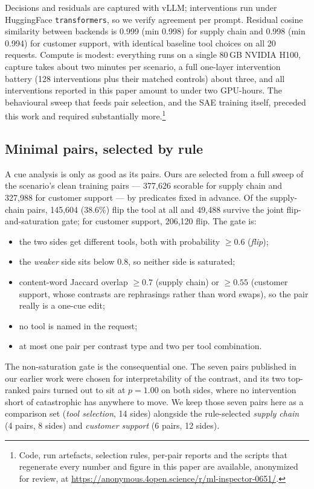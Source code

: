 \documentclass{article}
\begin{document}
Decisions and residuals are captured with vLLM; interventions run under HuggingFace \texttt{transformers}, so we verify agreement per prompt. Residual cosine similarity between backends is 0.999 (min 0.998) for supply chain and 0.998 (min 0.994) for customer support, with identical baseline tool choices on all 20 requests. Compute is modest: everything runs on a single 80\,GB NVIDIA H100, capture takes about two minutes per scenario, a full one-layer intervention battery (128 interventions plus their matched controls) about three, and all interventions reported in this paper amount to under two GPU-hours. The behavioural sweep that feeds pair selection, and the SAE training itself, preceded this work and required substantially more.\footnote{Code, run artefacts, selection rules, per-pair reports and the scripts that regenerate every number and figure in this paper are available, anonymized for review, at \url{https://anonymous.4open.science/r/ml-inspector-0651/}.}

\subsection{Minimal pairs, selected by rule}
\label{sec:pairs}

A cue analysis is only as good as its pairs. Ours are selected from a full sweep of the scenario's clean training pairs --- 377{,}626 scorable for supply chain and 327{,}988 for customer support --- by predicates fixed in advance. Of the supply-chain pairs, 145{,}604 (38.6\%) flip the tool at all and 49{,}488 survive the joint flip-and-saturation gate; for customer support, 206{,}120 flip. The gate is:

\begin{itemize}
\item the two sides get different tools, both with probability $\geq 0.6$ (\emph{flip});
\item the \emph{weaker} side sits below 0.8, so neither side is saturated;
\item content-word Jaccard overlap $\geq 0.7$ (supply chain) or $\geq 0.55$ (customer support, whose contrasts are rephrasings rather than word swaps), so the pair really is a one-cue edit;
\item no tool is named in the request;
\item at most one pair per contrast type and two per tool combination.
\end{itemize}

The non-saturation gate is the consequential one. The seven pairs published in our earlier work were chosen for interpretability of the contrast, and its two top-ranked pairs turned out to sit at $p = 1.00$ on both sides, where no intervention short of catastrophic has anywhere to move. We keep those seven pairs here as a comparison set (\emph{tool selection}, 14 sides) alongside the rule-selected \emph{supply chain} (4 pairs, 8 sides) and \emph{customer support} (6 pairs, 12 sides).
\end{document}
